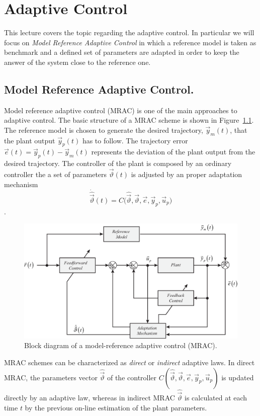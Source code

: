 \documentclass[11pt,a4paper,oneside]{book}
\numberwithin{equation}{section}
\theoremstyle{it}
\theoremstyle{definition}
\begin{document}
\chapter{Adaptive Control} 
This lecture covers the topic regarding the adaptive control. In particular we will focus on \textit{Model Reference Adaptive Control} in which a reference model is taken as benchmark and a defined set of parameters are adapted in order to keep the answer of the system close to the reference one. 

\section{Model Reference Adaptive Control.} 
Model reference adaptive control (MRAC) is one of the main approaches to adaptive control. The basic structure of a MRAC scheme is shown in Figure~\ref{figMRAC}. The reference model is chosen to generate the desired trajectory, $\vec{y}_m(t)$, that the plant output $\vec{y}_p(t)$ has to follow. The trajectory error $\vec{e}(t)= \vec{y}_p(t)-\vec{y}_m(t)$ represents the deviation of the plant output from the desired trajectory. The controller of the plant is composed by an ordinary controller the a set of parameters $\vec{\vartheta}(t)$ is adjusted by an proper adaptation mechanism $$\dot{\hat{\vec{\vartheta}}}(t) = C\Big(\hat{\vec{\vartheta}},\vec{\vartheta},\vec{e},\vec{y}_p,\vec{u}_p\Big)$$. 
\begin{figure}[H]
	\centering
	\includegraphics[width = 400pt, keepaspectratio]{figures/adaptive_control/mras_ctrl.eps}
	\captionsetup{width=0.75\textwidth}		
	\caption{Block diagram of a model-reference adaptive control (MRAC).}
	\label{figMRAC}
\end{figure}
MRAC schemes can be characterized as \textit{direct} or \textit{indirect} adaptive laws. In direct MRAC, the parameters vector $\hat{\vec{\vartheta}}$ of the controller $C(\hat{\vec{\vartheta}},\vec{\vartheta},\vec{e},\vec{y}_p,\vec{u}_p)$ is updated directly by an adaptive law, whereas in indirect MRAC $\hat{\vec{\vartheta}}$ is calculated at each time $t$ by the previous on-line estimation of the plant parameters.
\end{document}

